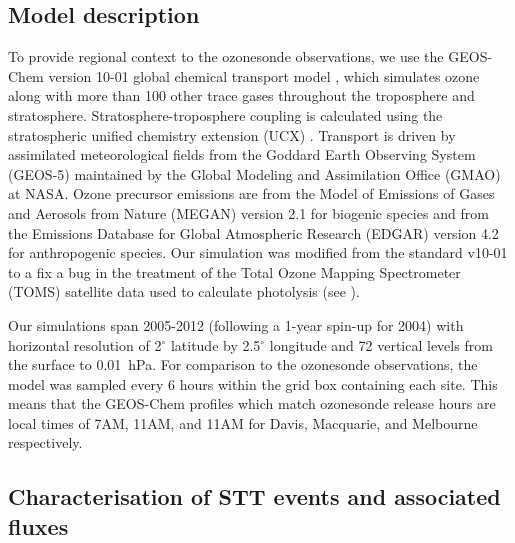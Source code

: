 \documentclass{article}
\begin{document}
  \subsection{Model description}
    \label{Section:GEOSChemDescription}
    To provide regional context to the ozonesonde observations, we use the GEOS-Chem version 10-01 global chemical transport model \citep{Bey2001}, which simulates ozone along with more than 100 other trace gases throughout the troposphere and stratosphere. 
    Stratosphere-troposphere coupling is calculated using the stratospheric unified chemistry extension (UCX) \citep{Eastham2014}.
    Transport is driven by assimilated meteorological fields from the Goddard Earth Observing System (GEOS-5) maintained by the Global Modeling and Assimilation Office (GMAO) at NASA.
    Ozone precursor emissions are from the Model of Emissions of Gases and Aerosols from Nature (MEGAN) version 2.1 \citep{Guenther2012} for biogenic species and from the Emissions Database for Global Atmospheric Research (EDGAR) version 4.2 for anthropogenic species.
    Our simulation was modified from the standard v10-01 to a fix a bug in the treatment of the Total Ozone Mapping Spectrometer (TOMS) satellite data used to calculate photolysis (see \citet{TomsFix2016}).  

    Our simulations span 2005-2012 (following a 1-year spin-up for 2004) with horizontal resolution of 2$^{\circ}$ latitude by 2.5$^{\circ}$ longitude and 72 vertical levels from the surface to 0.01~hPa.
    For comparison to the ozonesonde observations, the model was sampled every 6 hours within the grid box containing each site.
    This means that the GEOS-Chem profiles which match ozonesonde release hours are local times of 7AM, 11AM, and 11AM for Davis, Macquarie, and Melbourne respectively.
    
    
  \subsection{Characterisation of STT events and associated fluxes}
    \label{Section:CharacterisationOfSTTs}
    
\end{document}
